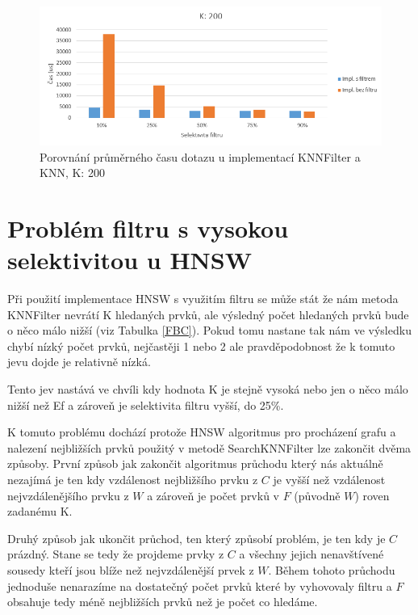 \documentclass[czech,semestral,dept460,male,csharp,cpdeclaration]{diploma}
\begin{document}
		\begin{figure}
			\centering
			\includegraphics[scale=0.8]{Figures/graf_filtr_k200.png}
			\caption{Porovnání průměrného času dotazu u implementací KNNFilter a KNN, K: 200}
			\label{graf_filtr_k200}
		\end{figure}
		
		\section{Problém filtru s vysokou selektivitou u HNSW}
		\label{FP}
		
			Při použití implementace HNSW s využitím filtru se může stát že nám metoda KNNFilter nevrátí K hledaných prvků, ale výsledný počet hledaných prvků bude o něco málo nižší (viz Tabulka \ref{FBC}). Pokud tomu nastane tak nám ve výsledku chybí nízký počet prvků, nejčastěji 1 nebo 2 ale pravděpodobnost že k tomuto jevu dojde je relativně nízká.
			
			Tento jev nastává ve chvíli kdy hodnota K je stejně vysoká nebo jen o něco málo nižší než Ef a zároveň je selektivita filtru vyšší, do 25\%.
			
			K tomuto problému dochází protože HNSW algoritmus pro procházení grafu a nalezení nejbližších prvků použitý v metodě SearchKNNFilter lze zakončit dvěma způsoby. První způsob jak zakončit algoritmus průchodu který nás aktuálně nezajímá je ten kdy vzdálenost nejbližšího prvku z $C$ je vyšší než vzdálenost nejvzdálenějšího prvku z $W$ a zároveň je počet prvků v $F$ (původně $W$) roven zadanému K.
			
			Druhý způsob jak ukončit průchod, ten který způsobí problém, je ten kdy je $C$ prázdný. Stane se tedy že projdeme prvky z $C$ a všechny jejich nenavštívené sousedy kteří jsou blíže než nejvzdálenější prvek z $W$. Během tohoto průchodu jednoduše nenarazíme na dostatečný počet prvků které by vyhovovaly filtru a $F$ obsahuje tedy méně nejbližších prvků než je počet co hledáme.
			
\end{document}
